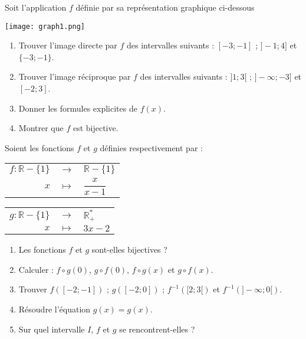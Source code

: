 \documentclass[12pt]{article}
\begin{document}

\bigskip

Soit l’application \( f \) définie par sa représentation graphique ci-dessous

\bigskip

\begin{center}
    \texttt{[image: graph1.png]} %
\end{center}

\bigskip

\begin{enumerate}
    \item Trouver l’image directe par \( f \) des intervalles suivants : \([ -3; -1 ]\) ; \( ] -1; 4] \) et \(\{ -3; -1 \}\).
    \item Trouver l’image réciproque par \( f \) des intervalles suivants : \( ]1;3[ \) ; \( ] -\infty; -3] \) et \([ -2; 3 ]\).
    \item Donner les formules explicites de \( f(x) \).
    \item Montrer que \( f \) est bijective.
\end{enumerate}


\bigskip

Soient les fonctions \( f \) et \( g \) définies respectivement par :

\renewcommand{\arraystretch}{1.3} %
\begin{tabular}{rcl}
    $f : \mathbb{R} - \{1\}$ & $\to$ & $\mathbb{R} - \{1\}$ \\
    $x$ & $\mapsto$ & $\dfrac{x}{x - 1}$
\end{tabular}

\bigskip

\begin{tabular}{rcl}
    $g : \mathbb{R} - \{1\}$ & $\to$ & $\mathbb{R}^{*}_{+}$ \\
    $x$ & $\mapsto$ & $3x - 2$
\end{tabular}

\bigskip

\begin{enumerate}
    \item Les fonctions \( f \) et \( g \) sont-elles bijectives ?
    \item Calculer : \( f \circ g(0) \), \( g \circ f(0) \), \( f \circ g(x) \) et \( g \circ f(x) \).
    \item Trouver \( f([-2; -1]) \) ; \( g([-2;0]) \) ; \( f^{-1}([2;3[) \) et \( f^{-1}(] - \infty; 0[) \).
    \item Résoudre l’équation \( g(x) = g(x) \).
    \item Sur quel intervalle \( I \), \( f \) et \( g \) se rencontrent-elles ?
\end{enumerate}
\end{document}
